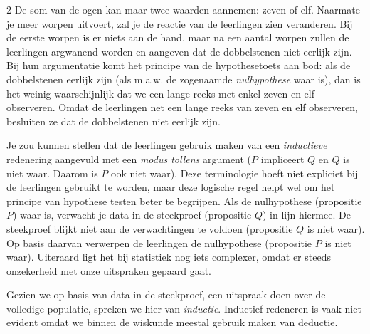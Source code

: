 \begin{multicols}{2}
De som van de ogen kan maar twee waarden aannemen: zeven of elf. Naarmate je meer worpen uitvoert, zal je de reactie van de leerlingen zien veranderen. Bij de eerste worpen is er niets aan de hand, maar na een aantal worpen zullen de leerlingen argwanend worden en aangeven dat de dobbelstenen niet eerlijk zijn. Bij hun argumentatie komt het principe van de hypothesetoets aan bod: als de dobbelstenen eerlijk zijn (als m.a.w. de zogenaamde \emph{nulhypothese} waar is), dan is het weinig waarschijnlijk dat we een lange reeks met enkel zeven en elf observeren. Omdat de leerlingen net een lange reeks van zeven en elf observeren, besluiten ze dat de dobbelstenen niet eerlijk zijn. 


Je zou kunnen stellen dat de leerlingen gebruik maken van een \emph{inductieve} redenering aangevuld met een \emph{modus tollens} argument ($P$ impliceert $Q$ en $Q$ is niet waar. Daarom is $P$ ook niet waar). Deze terminologie hoeft niet expliciet bij de leerlingen gebruikt te worden, maar deze logische regel helpt wel om het principe van hypothese testen beter te begrijpen. Als de nulhypothese (propositie $P$) waar is, verwacht je data in de steekproef (propositie $Q$) in lijn hiermee. De steekproef blijkt niet aan de verwachtingen te voldoen (propositie $Q$ is niet waar). Op basis daarvan verwerpen de leerlingen de nulhypothese (propositie $P$ is niet waar). Uiteraard ligt het bij statistiek nog iets complexer, omdat er steeds onzekerheid met onze uitspraken gepaard gaat. 

Gezien we op basis van data in de steekproef, een uitspraak doen over de volledige populatie, spreken we hier van \emph{inductie}. Inductief redeneren is vaak niet evident omdat we binnen de wiskunde meestal gebruik maken van deductie. 






\end{multicols}
